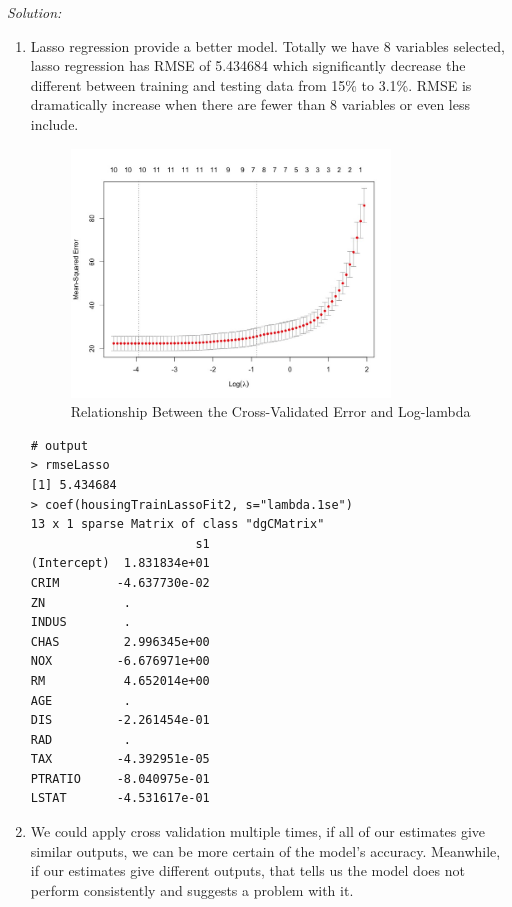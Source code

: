 \documentclass{article}
\newenvironment{solution}
    {\textit{Solution:}}
    {}
\begin{document}
\begin{solution}
\begin{enumerate}
\begin{lstlisting}
Call:  glmnet(x = housingTrainOther, y = housingTrainMEDV, alpha = 0,      lambda = seq(0, 3, 0.1)) 

   Df  %Dev Lambda
1  12 72.42    3.0
2  12 72.54    2.9
3  12 72.66    2.8
4  12 72.78    2.7
5  12 72.90    2.6
6  12 73.01    2.5
7  12 73.13    2.4
8  12 73.25    2.3
9  12 73.37    2.2
10 12 73.49    2.1
11 12 73.61    2.0
12 12 73.73    1.9
13 12 73.84    1.8
14 12 73.96    1.7
15 12 74.08    1.6
16 12 74.20    1.5
17 12 74.32    1.4
18 12 74.43    1.3
19 12 74.55    1.2
20 12 74.67    1.1
21 12 74.78    1.0
22 12 74.90    0.9
23 12 75.01    0.8
24 12 75.13    0.7
25 12 75.23    0.6
26 12 75.34    0.5
27 12 75.44    0.4
28 12 75.54    0.3
29 12 75.62    0.2
30 12 75.68    0.1
31 12 75.71    0.0
> rmseRidge
[1] 5.647947
	\end{lstlisting}
	\item \mbox{}
	Lasso regression provide a better model. Totally we have 8 variables selected, lasso regression has RMSE of 5.434684 which significantly decrease the different between training and testing data from 15\% to 3.1\%. RMSE is dramatically increase when there are fewer than 8 variables or even less include.
	\begin{figure}[h]
		\centering
		\includegraphics[width=0.8\textwidth]{figure4_Rplot.jpeg}
		\caption{Relationship Between the Cross-Validated Error and Log-lambda}
	\end{figure}	
	\newpage
	\begin{lstlisting}
# output
> rmseLasso 
[1] 5.434684
> coef(housingTrainLassoFit2, s="lambda.1se")
13 x 1 sparse Matrix of class "dgCMatrix"
                       s1
(Intercept)  1.831834e+01
CRIM        -4.637730e-02
ZN           .           
INDUS        .           
CHAS         2.996345e+00
NOX         -6.676971e+00
RM           4.652014e+00
AGE          .           
DIS         -2.261454e-01
RAD          .           
TAX         -4.392951e-05
PTRATIO     -8.040975e-01
LSTAT       -4.531617e-01	
	\end{lstlisting}
	\item \mbox{}
	We could apply cross validation multiple times, if all of our estimates give similar outputs, we can be more certain of the model’s accuracy. Meanwhile, if our estimates give different outputs, that tells us the model does not perform consistently and suggests a problem with it.
\end{enumerate}
\end{solution}
\end{document}
